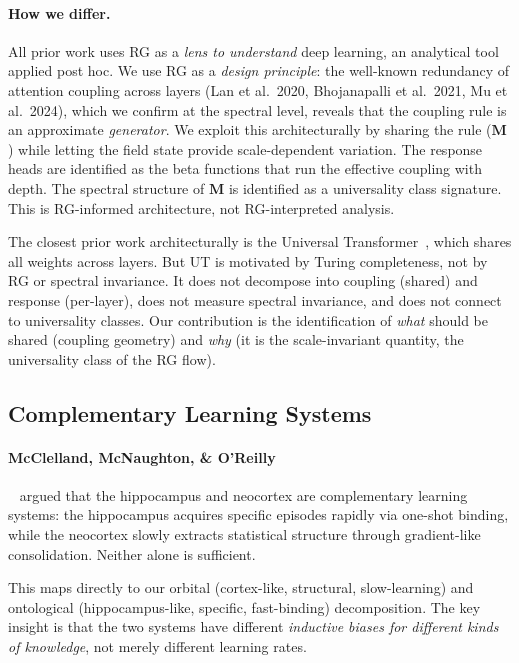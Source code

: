 \documentclass[11pt, a4paper]{article}
\newcommand{\M}{\mathbf{M}}
\theoremstyle{remark}
\begin{document}
\paragraph{How we differ.}
All prior work uses RG as a \emph{lens to understand} deep learning, an analytical tool applied post hoc.
We use RG as a \emph{design principle}: the well-known redundancy of attention coupling across layers (Lan et al.\ 2020, Bhojanapalli et al.\ 2021, Mu et al.\ 2024), which we confirm at the spectral level, reveals that the coupling rule is an approximate \emph{generator}. We exploit this architecturally by sharing the rule ($\M$) while letting the field state provide scale-dependent variation.
The response heads are identified as the beta functions that run the effective coupling with depth.
The spectral structure of $\M$ is identified as a universality class signature.
This is RG-informed architecture, not RG-interpreted analysis.

The closest prior work architecturally is the Universal Transformer~\cite{dehghani2019universal}, which shares all weights across layers.
But UT is motivated by Turing completeness, not by RG or spectral invariance.
It does not decompose into coupling (shared) and response (per-layer), does not measure spectral invariance, and does not connect to universality classes.
Our contribution is the identification of \emph{what} should be shared (coupling geometry) and \emph{why} (it is the scale-invariant quantity, the universality class of the RG flow).

\subsection{Complementary Learning Systems}

\paragraph{McClelland, McNaughton, \& O'Reilly}~\cite{mcclelland1995complementary} argued that the hippocampus and neocortex are complementary learning systems: the hippocampus acquires specific episodes rapidly via one-shot binding, while the neocortex slowly extracts statistical structure through gradient-like consolidation.
Neither alone is sufficient.

This maps directly to our orbital (cortex-like, structural, slow-learning) and ontological (hippocampus-like, specific, fast-binding) decomposition.
The key insight is that the two systems have different \emph{inductive biases for different kinds of knowledge}, not merely different learning rates.
\end{document}
